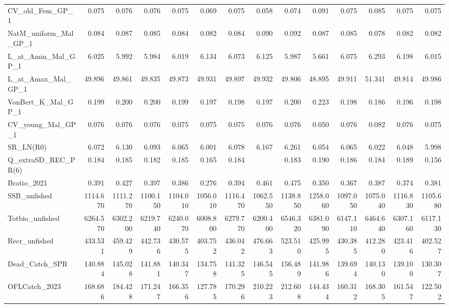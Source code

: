 \documentclass[
  english,
  a4paper,
]{article}
\begin{document}
\begin{table}
{\begin{tabular}[t]{lrrrrrrrrrrrrr}
CV\_old\_Fem\_GP\_1 & 0.075 & 0.076 & 0.076 & 0.075 & 0.069 & 0.075 & 0.058 & 0.074 & 0.091 & 0.075 & 0.085 & 0.075 & 0.075\\
NatM\_uniform\_Mal\_GP\_1 & 0.084 & 0.087 & 0.085 & 0.084 & 0.082 & 0.084 & 0.090 & 0.092 & 0.087 & 0.085 & 0.078 & 0.082 & 0.082\\
L\_at\_Amin\_Mal\_GP\_1 & 6.025 & 5.992 & 5.984 & 6.019 & 6.134 & 6.073 & 6.125 & 5.987 & 5.661 & 6.075 & 6.293 & 6.198 & 6.015\\
L\_at\_Amax\_Mal\_GP\_1 & 49.896 & 49.861 & 49.835 & 49.873 & 49.931 & 49.897 & 49.932 & 49.806 & 48.895 & 49.911 & 51.341 & 49.814 & 49.986\\
VonBert\_K\_Mal\_GP\_1 & 0.199 & 0.200 & 0.200 & 0.199 & 0.197 & 0.198 & 0.197 & 0.200 & 0.223 & 0.198 & 0.186 & 0.196 & 0.198\\
CV\_young\_Mal\_GP\_1 & 0.076 & 0.076 & 0.076 & 0.075 & 0.075 & 0.075 & 0.076 & 0.076 & 0.050 & 0.076 & 0.082 & 0.076 & 0.075\\
SR\_LN(R0) & 6.072 & 6.130 & 6.093 & 6.065 & 6.001 & 6.078 & 6.167 & 6.261 & 6.054 & 6.065 & 6.022 & 6.048 & 5.998\\
Q\_extraSD\_REC\_PR(6) & 0.184 & 0.185 & 0.182 & 0.185 & 0.165 & 0.184 &  & 0.183 & 0.190 & 0.186 & 0.184 & 0.189 & 0.156\\
Bratio\_2021 & 0.391 & 0.427 & 0.397 & 0.386 & 0.276 & 0.394 & 0.461 & 0.475 & 0.350 & 0.367 & 0.387 & 0.374 & 0.381\\
SSB\_unfished & 1114.670 & 1111.270 & 1100.150 & 1104.010 & 1056.010 & 1116.470 & 1062.550 & 1138.850 & 1258.060 & 1097.050 & 1075.040 & 1116.830 & 1105.680\\
Totbio\_unfished & 6264.570 & 6302.200 & 6219.740 & 6240.070 & 6008.800 & 6279.770 & 6200.400 & 6546.320 & 6381.090 & 6147.110 & 6464.640 & 6307.160 & 6117.130\\
Recr\_unfished & 433.531 & 459.429 & 442.736 & 430.575 & 403.752 & 436.042 & 476.663 & 523.510 & 425.995 & 430.385 & 412.280 & 423.416 & 402.527\\
Dead\_Catch\_SPR & 140.884 & 145.028 & 141.881 & 140.347 & 134.758 & 141.325 & 146.545 & 156.489 & 141.986 & 139.694 & 140.130 & 139.100 & 130.307\\
OFLCatch\_2023 & 168.686 & 184.428 & 171.247 & 166.356 & 127.785 & 170.296 & 210.223 & 212.608 & 144.434 & 160.312 & 168.305 & 161.547 & 122.502\\
\bottomrule
\end{tabular}}
\end{table}
\end{document}

